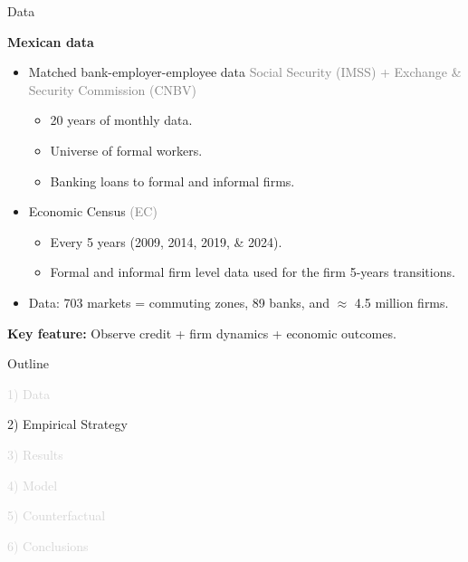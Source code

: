 \documentclass[aspectratio=169]{beamer}
\begin{document}


\begin{frame}{Data}

\textbf{Mexican data}

\vspace{5mm}

\begin{itemize}
    \item Matched bank-employer-employee data \textcolor{gray}{Social Security (IMSS) +  Exchange \& Security Commission (CNBV)}
    \begin{itemize}
        \item 20 years of monthly data.
        \item Universe of formal workers.
        \item Banking loans to formal and informal firms.
    \end{itemize}
    \vspace{5mm}
    \item Economic Census \textcolor{gray}{(EC)}
    \begin{itemize}
        \item Every 5 years (2009, 2014, 2019, \& 2024).
        \item Formal and informal firm level data used for the firm 5-years transitions.
    \end{itemize}
    \vspace{5mm}
    \item Data: 703 markets = commuting zones, 89 banks, and $\approx$ 4.5 million firms.
\end{itemize}

\vspace{5mm}

\begin{center}
    \large \textbf{Key feature:} Observe credit + firm dynamics + economic outcomes.
\end{center}
\end{frame}


\begin{frame}[noframenumbering]{Outline}

\Large

\textcolor{lightgray}{1) Data}

\vspace{5mm}

2) Empirical Strategy

\vspace{5mm}

\textcolor{lightgray}{3) Results}

\vspace{5mm}

\textcolor{lightgray}{4) Model}

\vspace{5mm}

\textcolor{lightgray}{5) Counterfactual}

\vspace{5mm}

\textcolor{lightgray}{6) Conclusions}

\end{frame}
\end{document}
